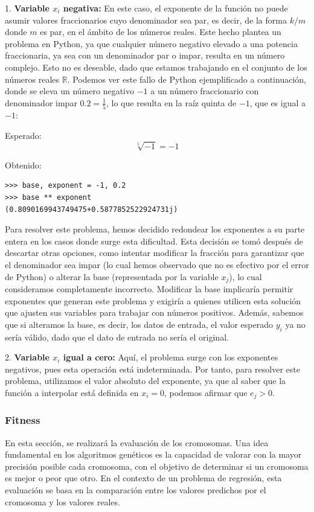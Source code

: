 \documentclass[conference,a4paper]{IEEEtran}
\begin{document}
1. \textbf{Variable \( x_i \) negativa:} En este caso, el exponente de la función no puede asumir valores fraccionarios cuyo denominador sea par, es decir, de la forma \( k/m \) donde \( m \) es par, en el ámbito de los números reales. Este hecho plantea un problema en Python, ya que cualquier número negativo elevado a una potencia fraccionaria, ya sea con un denominador par o impar, resulta en un número complejo. Esto no es deseable, dado que estamos trabajando en el conjunto de los números reales \( \mathbb{R} \). Podemos ver este fallo de Python ejemplificado a continuación, donde se eleva un número negativo \( -1 \) a un número fraccionario con denominador impar \( 0.2 = \frac{1}{5} \), lo que resulta en la raíz quinta de \(-1\), que es igual a \(-1\):

Esperado:
\[
\sqrt[5]{-1} = -1
\]

Obtenido:
\begin{verbatim}
>>> base, exponent = -1, 0.2
>>> base ** exponent
(0.8090169943749475+0.5877852522924731j)
\end{verbatim}

Para resolver este problema, hemos decidido redondear los exponentes a su parte entera en los casos donde surge esta dificultad. Esta decisión se tomó después de descartar otras opciones, como intentar modificar la fracción para garantizar que el denominador sea impar (lo cual hemos observado que no es efectivo por el error de Python) o alterar la base (representada por la variable \(x_j\)), lo cual consideramos completamente incorrecto. Modificar la base implicaría permitir exponentes que generan este problema y exigiría a quienes utilicen esta solución que ajusten sus variables para trabajar con números positivos. Además, sabemos que si alteramos la base, es decir, los datos de entrada, el valor esperado \(y_i\) ya no sería válido, dado que el dato de entrada no sería el original.




2. \textbf{Variable \( x_i \) igual a cero:} Aquí, el problema surge con los exponentes negativos, pues esta operación está indeterminada. Por tanto, para resolver este problema, utilizamos el valor absoluto del exponente, ya que al saber que la función a interpolar está definida en \( x_i = 0 \), podemos afirmar que \( e_j > 0 \).


\subsubsection{Fitness}
En esta sección, se realizará la evaluación de los cromosomas. Una idea fundamental en los algoritmos genéticos es la capacidad de valorar con la mayor precisión posible cada cromosoma, con el objetivo de determinar si un cromosoma es mejor o peor que otro. En el contexto de un problema de regresión, esta evaluación se basa en la comparación entre los valores predichos por el cromosoma y los valores reales.
\end{document}
